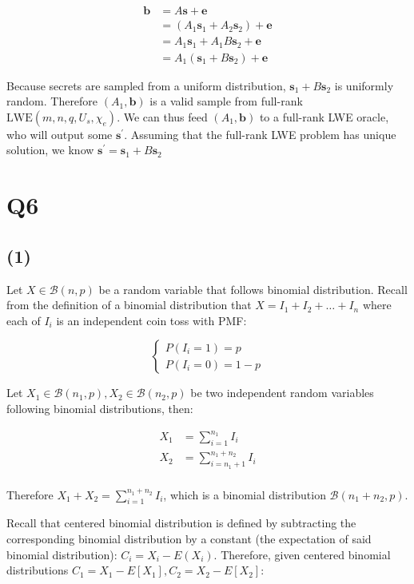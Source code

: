 \documentclass{article}
\begin{document}
$$
\begin{aligned}
\mathbf{b} &= A\mathbf{s} + \mathbf{e} \\
&= (A_1\mathbf{s}_1 + A_2\mathbf{s}_2) + \mathbf{e} \\
&= A_1\mathbf{s}_1 + A_1B\mathbf{s}_2 + \mathbf{e} \\
&= A_1(\mathbf{s}_1 + B\mathbf{s}_2) + \mathbf{e}
\end{aligned}
$$

Because secrets are sampled from a uniform distribution, $\mathbf{s}_1 + B\mathbf{s}_2$ is uniformly random. Therefore $(A_1, \mathbf{b})$ is a valid sample from full-rank $\text{LWE}(m, n, q, U_s, \chi_e)$. We can thus feed $(A_1, \mathbf{b})$ to a full-rank LWE oracle, who will output some $\mathbf{s}^\prime$. Assuming that the full-rank LWE problem has unique solution, we know $\mathbf{s}^\prime = \mathbf{s}_1 + B\mathbf{s}_2$


\newpage

\section*{Q6}
\subsection*{(1)}
Let $X \in \mathcal{B}(n, p)$ be a random variable that follows binomial distribution. Recall from the definition of a binomial distribution that $X = I_1 + I_2 + \ldots + I_n$ where each of $I_i$ is an independent coin toss with PMF:

$$
\begin{cases}
P(I_i=1) = p \\
P(I_i=0) = 1-p
\end{cases}
$$

Let $X_1 \in \mathcal{B}(n_1, p), X_2 \in \mathcal{B}(n_2, p)$ be two independent random variables following binomial distributions, then:

$$
\begin{aligned}
X_1 &= \sum_{i=1}^{n_1} I_i \\
X_2 &= \sum_{i=n_1 + 1}^{n_1 + n_2} I_i \\
\end{aligned}
$$

Therefore $X_1 + X_2 = \sum_{i=1}^{n_1 + n_2} I_i$, which is a binomial distribution $\mathcal{B}(n_1 + n_2, p)$.

Recall that centered binomial distribution is defined by subtracting the corresponding binomial distribution by a constant (the expectation of said binomial distribution): $C_i = X_i - E(X_i)$. Therefore, given centered binomial distributions $C_1 = X_1 - E[X_1], C_2 = X_2 - E[X_2]$:
\end{document}
